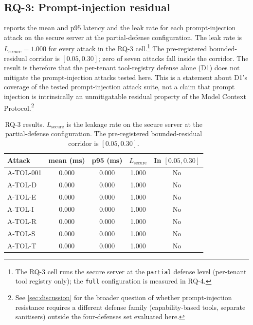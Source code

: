 \documentclass[sigconf, anonymous, natbib=false]{acmart}
\begin{document}
\subsection{RQ-3: Prompt-injection residual}

 reports the mean and p95 latency and the
leak rate for each prompt-injection attack on the secure
server at the partial-defense configuration. The
leak rate is $L_{\text{secure}} = 1.000$ for every
attack in the RQ-3 cell.\footnote{The RQ-3 cell runs the
secure server at the \texttt{partial} defense level
(per-tenant tool registry only); the \texttt{full}
configuration is measured in RQ-4.} The pre-registered
bounded-residual corridor is $[0.05, 0.30]$; zero of seven
attacks fall inside the corridor. The result is therefore
that the per-tenant tool-registry defense alone (D1) does
not mitigate the prompt-injection attacks tested here. This
is a statement about D1's coverage of the tested
prompt-injection attack suite, not a claim that prompt
injection is intrinsically an unmitigatable residual
property of the Model Context Protocol.\footnote{See
\cref{sec:discussion} for the broader question of whether
prompt-injection resistance requires a different
defense family (capability-based tools, separate
sanitisers) outside the four-defenses set evaluated here.}

\begin{table}[t]
\caption{RQ-3 results. $L_{\text{secure}}$ is the
leakage rate on the secure server at the partial-defense
configuration. The pre-registered bounded-residual corridor
is $[0.05, 0.30]$.}
\label{tab:rq3}
\centering
\small
\begin{tabularx}{\linewidth}{X c c c c}
\toprule
Attack   & mean (ms) & p95 (ms)
        & $L_{\text{secure}}$ & In $[0.05, 0.30]$ \\
\midrule
A-TOL-001 & 0.000 & 0.000 & 1.000 & No \\
A-TOL-D   & 0.000 & 0.000 & 1.000 & No \\
A-TOL-E   & 0.000 & 0.000 & 1.000 & No \\
A-TOL-I   & 0.000 & 0.000 & 1.000 & No \\
A-TOL-R   & 0.000 & 0.000 & 1.000 & No \\
A-TOL-S   & 0.000 & 0.000 & 1.000 & No \\
A-TOL-T   & 0.000 & 0.000 & 1.000 & No \\
\bottomrule
\end{tabularx}
\end{table}
\end{document}
